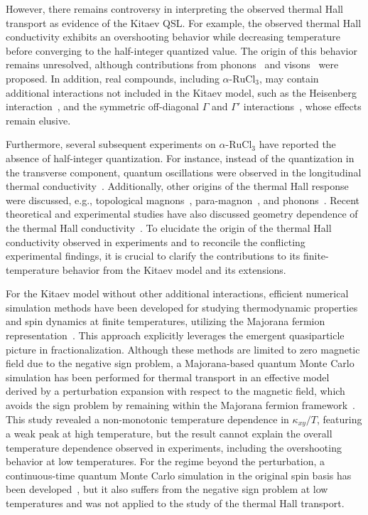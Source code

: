 \documentclass[twocolumn,superscriptaddress,showpacs, longbibliography, aps, prx]{revtex4-2}
\begin{document}
However, there remains controversy in interpreting the observed thermal Hall transport as evidence of the Kitaev QSL. 
For example, the observed thermal Hall conductivity exhibits an overshooting behavior while decreasing temperature before converging to the half-integer quantized value. 
The origin of this behavior remains unresolved, although contributions from phonons~\cite{Ye2018Quantization,Vinkler2018} and visons~\cite{Joy2022} were proposed. 
In addition, real compounds, including $\alpha$-$\mathrm{RuCl_3}$, may contain additional interactions not included in the Kitaev model, such as the Heisenberg interaction~\cite{Chaloupka_PRL2010,Chaloupka_PRL2013}, and the symmetric off-diagonal $\Gamma$ and $\Gamma'$ interactions~\cite{Rau2014,Rau2014pre,Winter2016}, whose effects remain elusive. 

Furthermore, several subsequent experiments on $\alpha$-$\mathrm{RuCl_3}$ have reported the absence of half-integer quantization. 
For instance, instead of the quantization in the transverse component, quantum oscillations were observed in the longitudinal thermal conductivity~\cite{Czajka_NPhy2021}. 
Additionally, other origins of the thermal Hall response were discussed, e.g., topological magnons~\cite{Czajka_NMat2023,ChernZK2021,ZhangCK2021, McClartyDGRPMP2018,Joshi2018}, para-magnon~\cite{Hentrich_PRB2019}, and phonons~\cite{Lefra_PRX2022, OhN2025}. 
Recent theoretical and experimental studies have also discussed geometry dependence of the thermal Hall conductivity~\cite{Halasz2025,ZhangHGJWTMY2025}.
To elucidate the origin of the thermal Hall conductivity observed in experiments and to reconcile the conflicting experimental findings, it is crucial to clarify the contributions to its finite-temperature behavior from the Kitaev model and its extensions.

For the Kitaev model without other additional interactions, efficient numerical simulation methods have been developed for studying thermodynamic properties and spin dynamics at finite temperatures, utilizing the Majorana fermion representation~\cite{NasuUM2014,NasuUM2015,YoshitakeNM2016,YoshitakeNKM2017,YoshitakeNM2017}. 
This approach explicitly leverages the emergent quasiparticle picture in fractionalization. 
Although these methods are limited to zero magnetic field due to the negative sign problem, a Majorana-based quantum Monte Carlo simulation has been performed for thermal transport in an effective model derived by a perturbation expansion with respect to the magnetic field, which avoids the sign problem by remaining within the Majorana fermion framework~\cite{NasuYM2017}. 
This study revealed a non-monotonic temperature dependence in $\kappa_{xy}/T$, featuring a weak peak at high temperature, but the result cannot explain the overall temperature dependence observed in experiments, including the overshooting behavior at low temperatures. 
For the regime beyond the perturbation, a continuous-time quantum Monte Carlo simulation in the original spin basis has been developed~\cite{YoshitakeNKM2020}, but it also suffers from the negative sign problem at low temperatures and was not applied to the study of the thermal Hall transport. 
\end{document}
